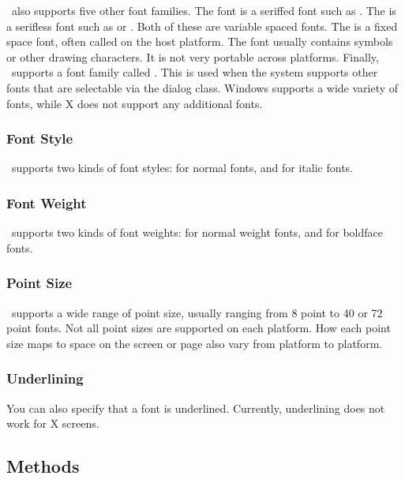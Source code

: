\V\ also supports five other font families. The  font
is a seriffed font such as . The 
is a serifless font such as  or . Both
of these are variable spaced fonts. The  is a fixed
space font, often called  on the host platform.
The  font usually contains symbols or other drawing
characters. It is not very portable across platforms. Finally,
\V\ supports a font family called . This is used when
the system supports other fonts that are selectable via the
 dialog class. Windows supports a wide variety of fonts,
while X does not support any additional fonts.

\subsubsection*{Font Style}

\V\ supports two kinds of font styles:  for normal
fonts, and  for italic fonts.

\subsubsection*{Font Weight}

\V\ supports two kinds of font weights:  for
normal weight fonts, and  for boldface fonts.

\subsubsection*{Point Size}

\V\ supports a wide range of point size, usually ranging from 8 point
to 40 or 72 point fonts. Not all point sizes are supported on each
platform. How each point size maps to space on the screen or page
also vary from platform to platform.

\subsubsection*{Underlining}

You can also specify that a font is underlined. Currently, underlining
does not work for X screens.

\subsection* {Methods}

